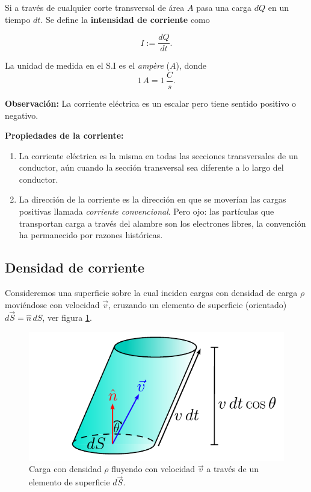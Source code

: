 Si a través de cualquier corte transversal de área $A$  pasa una carga $dQ$ en un tiempo $dt$. Se define la \textbf{intensidad de corriente} como
\begin{shaded}
$$I:= \frac{dQ}{dt}.$$
\end{shaded}

La unidad de medida en el S.I es el \textit{ampère} ($A$), donde 
$$1 \, A = 1 \, \frac{C}{s}.$$

\textbf{Observación:} La corriente eléctrica es un escalar pero tiene sentido positivo o negativo.

\textbf{Propiedades de la corriente:}

\begin{enumerate}
\item La corriente eléctrica es la misma en todas las secciones transversales de un conductor, aún cuando la sección transversal sea diferente a lo largo del conductor.

\item La dirección de la corriente es la dirección en que se moverían las cargas positivas llamada \textit{corriente convencional}. Pero ojo: las partículas que transportan carga a través del alambre son los electrones libres, la convención ha permanecido por razones históricas.
\end{enumerate}

\subsection{Densidad de corriente}

Consideremos una superficie sobre la cual inciden cargas con densidad de carga $\rho$ moviéndose con velocidad $\Vec{v}$, cruzando un elemento de superficie (orientado) $d\Vec{S} = \hat{n} \,dS$, ver figura \ref{fig:Densidad-Corriente}.

\begin{figure}[H]
    \centering
    \includegraphics[scale = 0.95]{Figuras/Densidad-Corriente.pdf}
    \caption{Carga con densidad $\rho$ fluyendo con velocidad $\Vec{v}$ a través de un elemento de superficie $d\Vec{S}$.}
    \label{fig:Densidad-Corriente}
\end{figure}

